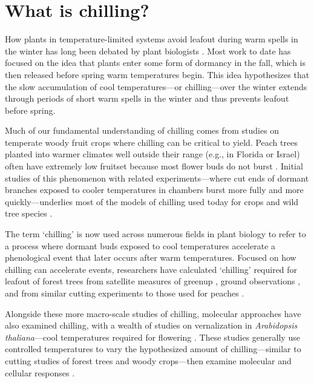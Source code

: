 \documentclass[11pt]{article}
\begin{document}
\section*{What is chilling?}

How plants in temperature-limited systems avoid leafout during warm spells in the winter has long been debated by plant biologists \citep[e.g.,][]{lamb1948effect,weinberger}. Most work to date has focused on the idea that plants enter some form of dormancy in the fall, which is then released before spring warm temperatures begin. This idea hypothesizes that the slow accumulation of cool temperatures---or chilling---over the winter extends through periods of short warm spells in the winter and thus prevents leafout before spring. 

Much of our fundamental understanding of chilling comes from studies on temperate woody fruit crops where chilling can be critical to yield. Peach trees planted into warmer climates well outside their range (e.g., in Florida or Israel) often have extremely low fruitset because most flower buds do not burst \citep{weinberger,overcash1955effects,erez1971improved}. Initial studies of this phenomenon with related experiments---where cut ends of dormant branches exposed to cooler temperatures in chambers burst more fully and more quickly---underlies most of the models of chilling used today for crops and wild tree species \citep[][]{weinberger,ospreebbms}. %

The term `chilling' is now used across numerous fields in plant biology to refer to a process where dormant buds exposed to cool temperatures accelerate a phenological event that later occurs after warm temperatures. Focused on how chilling can accelerate events, researchers have calculated `chilling' required for leafout of forest trees from satellite measures of greenup \citep{kaduk2011predicting}, ground observations \citep{Luedeling2009}, and from similar cutting experiments to those used for peaches \citep[reviewed in][]{ospreebbms}.  %

Alongside these more macro-scale studies of chilling, molecular approaches have also examined chilling, with a wealth of studies on vernalization in \emph{Arabidopsis thaliana}---cool temperatures required for flowering \citep{kim2009vernalization}. These studies generally use controlled temperatures to vary the hypothesized amount of chilling---similar to cutting studies of forest trees and woody crops---then examine molecular and cellular responses \citep[e.g.,][]{pan2021aba,azeez2021early,cai2024molecular}. %
\end{document}
